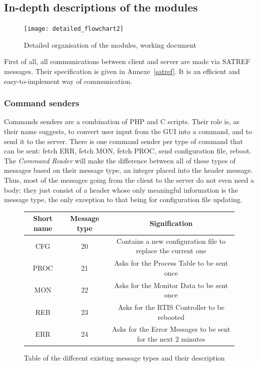 \documentclass{themeensg}
\begin{document}
\clearpage
\subsection{In-depth descriptions of the modules}

\begin{figure}[!hb]
	\centering
	\texttt{[image: detailed\_flowchart2]}
	\caption{Detailed organisation of the modules, working document}
\end{figure}

First of all, all communications between client and server are made via SATREF messages. Their specification is given in Annexe~\ref{satref}. It is an efficient and easy-to-implement way of communication.

\clearpage
\subsubsection{Command senders}

Commands senders are a combination of PHP and C scripts. Their role is, as their name suggests, to convert user input from the GUI into a command, and to send it to the server. There is one command sender per type of command that can be sent: fetch ERR, fetch MON, fetch PROC, send configuration file, reboot. The \textit{Command Reader} will make the difference between all of these types of messages based on their message type, an integer placed into the header message. Thus, most of the messages going from the client to the server do not even need a body: they just consist of a header whose only meaningful information is the message type, the only exception to that being for configuration file updating.\\

\begin{figure}[H]
	\begin{tabular}{|c|c|c|}
	  \hline
	  Short name & Message type & Signification \\
	  \hline
	  CFG & 20 & Contains a new configuration file to replace the current one \\
	  PROC & 21 & Asks for the Process Table to be sent once \\
	  MON & 22 & Asks for the Monitor Data to be sent once \\
	  REB & 23 & Asks for the RTIS Controller to be rebooted \\
	  ERR & 24 & Asks for the Error Messages to be sent for the next 2 minutes \\
	  \hline
	\end{tabular}
	\caption{Table of the different existing message types and their description}
\end{figure}
\end{document}

